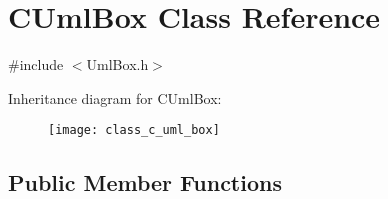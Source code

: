 \hypertarget{class_c_uml_box}{}\section{C\+Uml\+Box Class Reference}
\label{class_c_uml_box}


{\ttfamily \#include $<$Uml\+Box.\+h$>$}

Inheritance diagram for C\+Uml\+Box\+:\begin{figure}[H]
\begin{center}
\leavevmode
\texttt{[image: class\_c\_uml\_box]}
\end{center}
\end{figure}
\subsection*{Public Member Functions}
